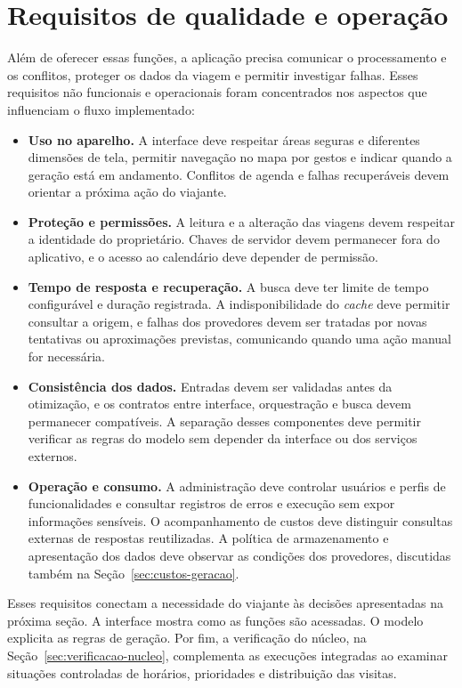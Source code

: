 \section{Requisitos de qualidade e operação}
\label{sec:requisitos-qualidade}

Além de oferecer essas funções, a aplicação precisa comunicar o processamento e os conflitos, proteger os dados da viagem e permitir investigar falhas. Esses requisitos não funcionais e operacionais foram concentrados nos aspectos que influenciam o fluxo implementado:

\begin{itemize}
  \item \textbf{Uso no aparelho.} A interface deve respeitar áreas seguras e diferentes dimensões de tela, permitir navegação no mapa por gestos e indicar quando a geração está em andamento. Conflitos de agenda e falhas recuperáveis devem orientar a próxima ação do viajante.
  \item \textbf{Proteção e permissões.} A leitura e a alteração das viagens devem respeitar a identidade do proprietário. Chaves de servidor devem permanecer fora do aplicativo, e o acesso ao calendário deve depender de permissão.
  \item \textbf{Tempo de resposta e recuperação.} A busca deve ter limite de tempo configurável e duração registrada. A indisponibilidade do \textit{cache} deve permitir consultar a origem, e falhas dos provedores devem ser tratadas por novas tentativas ou aproximações previstas, comunicando quando uma ação manual for necessária.
  \item \textbf{Consistência dos dados.} Entradas devem ser validadas antes da otimização, e os contratos entre interface, orquestração e busca devem permanecer compatíveis. A separação desses componentes deve permitir verificar as regras do modelo sem depender da interface ou dos serviços externos.
  \item \textbf{Operação e consumo.} A administração deve controlar usuários e perfis de funcionalidades e consultar registros de erros e execução sem expor informações sensíveis. O acompanhamento de custos deve distinguir consultas externas de respostas reutilizadas. A política de armazenamento e apresentação dos dados deve observar as condições dos provedores, discutidas também na Seção~\ref{sec:custos-geracao}.
\end{itemize}

Esses requisitos conectam a necessidade do viajante às decisões apresentadas na próxima seção. A interface mostra como as funções são acessadas. O modelo explicita as regras de geração. Por fim, a verificação do núcleo, na Seção~\ref{sec:verificacao-nucleo}, complementa as execuções integradas ao examinar situações controladas de horários, prioridades e distribuição das visitas.
